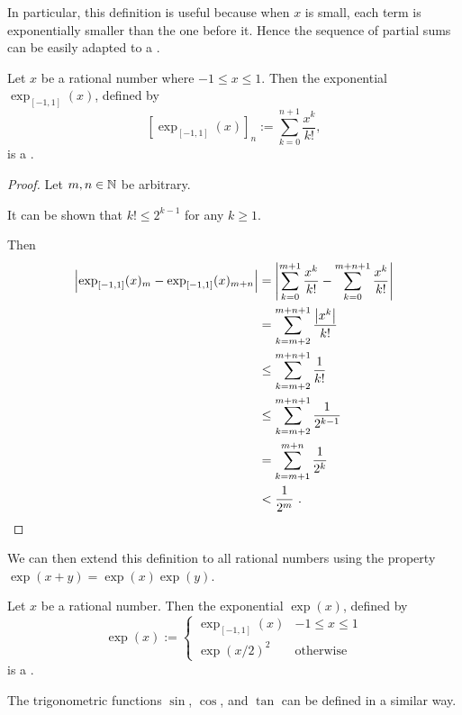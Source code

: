 \documentclass[leqno]{report}
\begin{document}
In particular, this definition is useful because when $x$ is small, each term is exponentially smaller than the one before it. Hence the sequence of partial sums can be easily adapted to a \FCCS.

\begin{Proposition}
    Let $x$ be a rational number where $-1 \leq x \leq 1$. Then the exponential $\exp_{[-1,1]}(x)$, defined by
    \[
        \left[\exp_{[-1,1]}(x)\right]_n := \sum_{k=0}^{n+1} \frac{x^k}{k!},
    \]
    is a \FCCS.
\end{Proposition}

\begin{proof}
    Let $m, n \in \mathbb{N}$ be arbitrary.

    It can be shown that $k! \leq 2^{k-1}$ for any $k \geq 1$.

    Then
    \begin{align*}
        \left| \exp_{[-1,1]}(x)_m - \exp_{[-1,1]}(x)_{m+n} \right|
        &= \left| \sum_{k=0}^{m+1} \frac{x^k}{k!} - \sum_{k=0}^{m+n+1} \frac{x^k}{k!} \right| \\
        &= \sum_{k=m+2}^{m+n+1} \frac{\left| x^k \right|}{k!} \\
        &\leq \sum_{k=m+2}^{m+n+1} \frac{1}{k!} \\
        &\leq \sum_{k=m+2}^{m+n+1} \frac{1}{2^{k-1}} \\
        &= \sum_{k=m+1}^{m+n} \frac{1}{2^k} \\
        &< \frac{1}{2^m} \ . \qedhere
    \end{align*}
\end{proof}

We can then extend this definition to all rational numbers using the property $\exp(x + y) = \exp(x)\exp(y)$.

\begin{Corollary}[Exponential on $\Q$]
    Let $x$ be a rational number. Then the exponential $\exp(x)$, defined by
    \[
        \exp(x) := \begin{cases}
            \exp_{[-1,1]}(x) & -1 \leq x \leq 1 \\
            \exp(x/2)^2 & \textrm{otherwise}
        \end{cases}
    \]
    is a \FCCS.
\end{Corollary}

The trigonometric functions $\sin$, $\cos$, and $\tan$ can be defined in a similar way.
\end{document}
